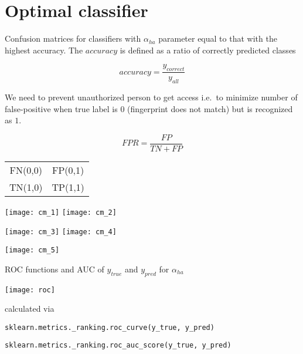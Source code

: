 \documentclass[11pt]{article}
\begin{document}
    \section{Optimal classifier}\label{sec:opt_class}

    Confusion matrices for classifiers with $\alpha_{ha}$ parameter equal to that
    with the highest accuracy.
    The $accuracy$ is defined as a ratio of correctly predicted classes

    \begin{equation}
        accuracy = \frac{y_{correct}}{y_{all}}\label{eq:accuracy}
    \end{equation}

    We need to prevent unauthorized person to get access i.e.\ to minimize number of false-positive
    when true label is $0$ (fingerprint does not match) but is recognized as $1$.

    \begin{equation}
        FPR = \frac{FP}{TN + FP}\label{eq:fpr}
    \end{equation}

    \begin{center}
        \begin{tabular}{ c c }
            FN(0,0) & FP(0,1) \\
            TN(1,0) & TP(1,1) \\
        \end{tabular}
    \end{center}

    \texttt{[image: cm\_1]}
    \texttt{[image: cm\_2]}

    \texttt{[image: cm\_3]}
    \texttt{[image: cm\_4]}

    \texttt{[image: cm\_5]}

    \newpage

    ROC functions and AUC of $y_{true}$ and $y_{pred}$ for $\alpha_{ha}$

    \texttt{[image: roc]}

    calculated via

    \texttt{sklearn.metrics.\_ranking.roc\_curve(y\_true, y\_pred)}

    \texttt{sklearn.metrics.\_ranking.roc\_auc\_score(y\_true, y\_pred)}
\end{document}
